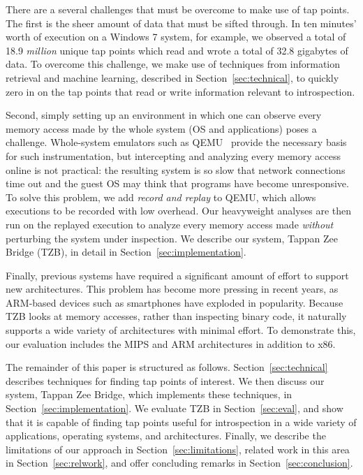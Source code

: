 There are a several challenges that must be overcome to make use of tap
points. The first is the sheer amount of data that must be sifted
through. In ten minutes' worth of execution on a Windows 7 system, for
example, we observed a total of 18.9 \emph{million} unique tap points
which read and wrote a total of 32.8 gigabytes of data. To overcome this
challenge, we make use of techniques from information retrieval and
machine learning, described in Section~\ref{sec:technical}, to quickly
zero in on the tap points that read or write information relevant to
introspection.

Second, simply setting up an environment in which one can observe every
memory access made by the whole system (OS and applications) poses a
challenge. Whole-system emulators such as QEMU~\cite{Bellard:2005}
provide the necessary basis for such instrumentation, but intercepting
and analyzing every memory access online is not practical: the resulting
system is so slow that network connections time out and the guest OS may
think that programs have become unresponsive. To solve this problem, we
add \emph{record and replay} to QEMU, which allows executions to be
recorded with low overhead. Our heavyweight analyses are then run on
the replayed execution to analyze every memory access made
\emph{without} perturbing the system under inspection. We describe our
system, Tappan Zee Bridge (TZB), in detail in
Section~\ref{sec:implementation}.

Finally, previous systems have required a significant amount of effort
to support new architectures. This problem has become more pressing in
recent years, as ARM-based devices such as smartphones have exploded in
popularity. Because TZB looks at memory accesses, rather than inspecting
binary code, it naturally supports a wide variety of architectures with
minimal effort. To demonstrate this, our evaluation includes the MIPS
and ARM architectures in addition to x86.

The remainder of this paper is structured as follows.
Section~\ref{sec:technical} describes techniques for finding tap points
of interest. We then discuss our system, Tappan Zee Bridge, which
implements these techniques, in Section~\ref{sec:implementation}. We
evaluate TZB in Section~\ref{sec:eval}, and show that it is capable of
finding tap points useful for introspection in a wide variety of
applications, operating systems, and architectures. Finally, we describe
the limitations of our approach in Section~\ref{sec:limitations},
related work in this area in Section~\ref{sec:relwork}, and offer
concluding remarks in Section~\ref{sec:conclusion}.

